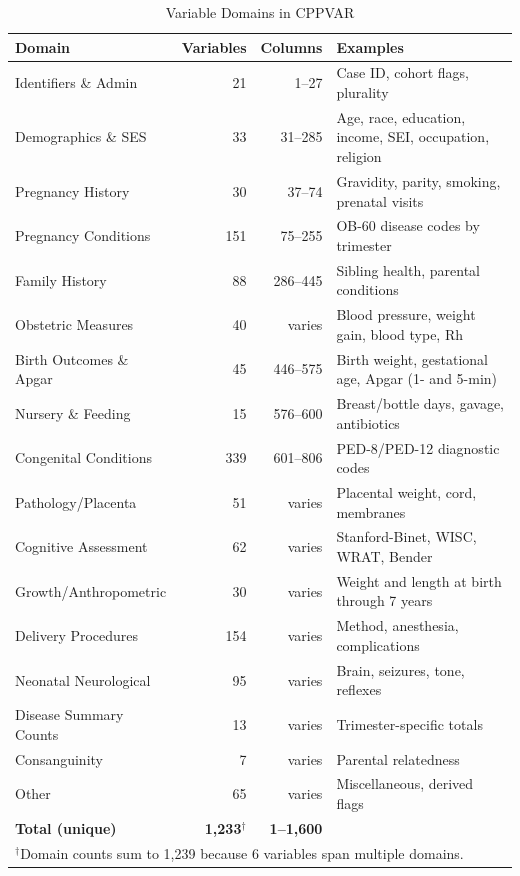 \documentclass[12pt]{article}
\begin{document}
\begin{table}[H]
\singlespacing
\centering
\caption{Variable Domains in CPPVAR}
\label{tab:domains}
\small
\begin{tabular}{lrrp{5.5cm}}
\toprule
Domain & Variables & Columns & Examples \\
\midrule
Identifiers \& Admin & 21 & 1--27 & Case ID, cohort flags, plurality \\
Demographics \& SES & 33 & 31--285 & Age, race, education, income, SEI, occupation, religion \\
Pregnancy History & 30 & 37--74 & Gravidity, parity, smoking, prenatal visits \\
Pregnancy Conditions & 151 & 75--255 & OB-60 disease codes by trimester \\
Family History & 88 & 286--445 & Sibling health, parental conditions \\
Obstetric Measures & 40 & varies & Blood pressure, weight gain, blood type, Rh \\
Birth Outcomes \& Apgar & 45 & 446--575 & Birth weight, gestational age, Apgar (1- and 5-min) \\
Nursery \& Feeding & 15 & 576--600 & Breast/bottle days, gavage, antibiotics \\
Congenital Conditions & 339 & 601--806 & PED-8/PED-12 diagnostic codes \\
Pathology/Placenta & 51 & varies & Placental weight, cord, membranes \\
Cognitive Assessment & 62 & varies & Stanford-Binet, WISC, WRAT, Bender \\
Growth/Anthropometric & 30 & varies & Weight and length at birth through 7 years \\
Delivery Procedures & 154 & varies & Method, anesthesia, complications \\
Neonatal Neurological & 95 & varies & Brain, seizures, tone, reflexes \\
Disease Summary Counts & 13 & varies & Trimester-specific totals \\
Consanguinity & 7 & varies & Parental relatedness \\
Other & 65 & varies & Miscellaneous, derived flags \\
\midrule
\textbf{Total (unique)} & \textbf{1,233}$^\dagger$ & \textbf{1--1,600} & \\
\bottomrule
\multicolumn{4}{l}{\small $^\dagger$Domain counts sum to 1,239 because 6 variables span multiple domains.}
\end{tabular}
\end{table}
\end{document}
